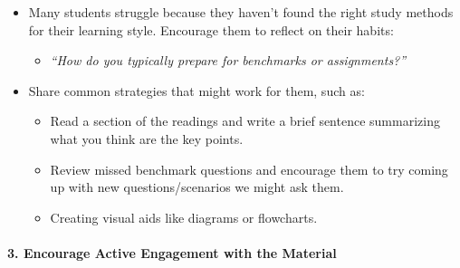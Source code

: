 \documentclass[
]{article}
\providecommand{\tightlist}{%
  \setlength{\itemsep}{0pt}\setlength{\parskip}{0pt}}
\begin{document}
\begin{itemize}
\tightlist
\item
  Many students struggle because they haven't found the right study methods for their learning style. Encourage them to reflect on their habits:

  \begin{itemize}
  \tightlist
  \item
    \emph{``How do you typically prepare for benchmarks or assignments?''}
  \end{itemize}
\item
  Share common strategies that might work for them, such as:

  \begin{itemize}
  \tightlist
  \item
    Read a section of the readings and write a brief sentence summarizing what you think are the key points.
  \item
    Review missed benchmark questions and encourage them to try coming up with new questions/scenarios we might ask them.
  \item
    Creating visual aids like diagrams or flowcharts.
  \end{itemize}
\end{itemize}

\hypertarget{encourage-active-engagement-with-the-material}{%
\paragraph*{3. Encourage Active Engagement with the Material}\label{encourage-active-engagement-with-the-material}}
\end{document}
